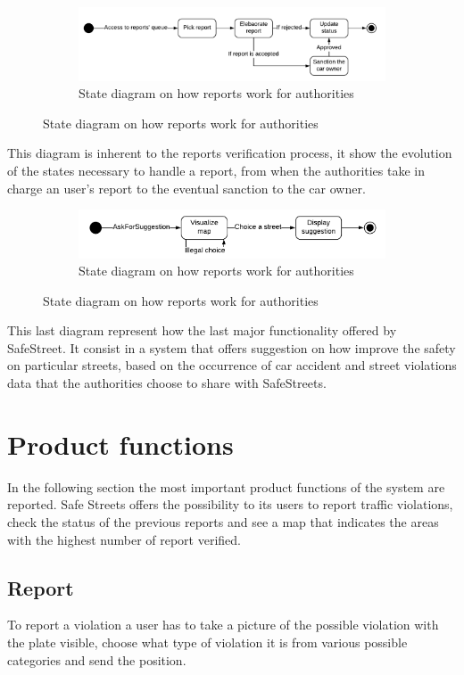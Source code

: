 \documentclass[12pt,a4paper]{report}
\begin{document}
		\begin{figure}[H]
			\begin{subfigure}{\textwidth}
				\includegraphics[scale = 0.75, center]{reportA}
				\caption{State diagram on how reports work for authorities}
			\end{subfigure}
		\end{figure}	
		This diagram is inherent to the reports verification process,
		it show the evolution of the states necessary to handle a report, from when the authorities take in charge an user's report
		to the eventual sanction to the car owner.
		
		\begin{figure}[H]
			\begin{subfigure}{\textwidth}
				\includegraphics[scale = 0.75, center]{suggestion}
				\caption{State diagram on how reports work for authorities}
			\end{subfigure}
		\end{figure}
		This last diagram represent how the last major functionality offered by SafeStreet. It consist in a system that offers suggestion
		on how improve the safety on particular streets, based on the occurrence of car accident and street violations data that
		the authorities choose to share with SafeStreets.
		  
		
	\section{Product functions}
		In the following section the most important product functions of the system are reported.
		Safe Streets offers the possibility to its users to report traffic violations, check the status of the previous reports and see 
		a map that indicates the areas with the highest number of report verified.
		\subsection{Report}
			To report a violation a user has to take a picture of the possible violation with the plate visible, choose what type of
			violation it is from various possible categories and send the position.
\end{document}
